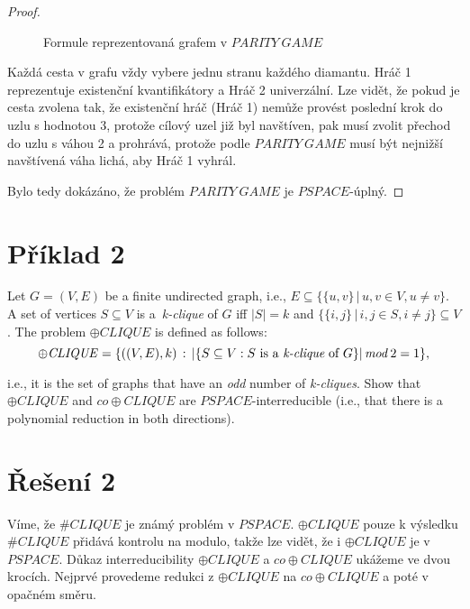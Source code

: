\documentclass[a4paper, 11pt, fleqn]{scrartcl}
\begin{document}
\begin{proof}
\begin{adjustwidth}{1em}{0em}
\begin{figure}[h]
\begin{tikzpicture}
            \end{tikzpicture}
            \caption{Formule reprezentovaná grafem v $\mathit{PARITY~GAME}$}
          \end{figure}

          Každá cesta v grafu vždy vybere jednu stranu každého diamantu. Hráč 1 reprezentuje existenční kvantifikátory a Hráč 2 univerzální. Lze vidět, že pokud je cesta zvolena tak, že existenční hráč (Hráč 1) nemůže provést poslední krok do uzlu s hodnotou 3, protože cílový uzel již byl navštíven, pak musí zvolit přechod do uzlu s váhou 2 a prohrává, protože podle $\mathit{PARITY~GAME}$ musí být nejnižší navštívená váha lichá, aby Hráč 1 vyhrál.
        \end{adjustwidth}

        \vspace{0.5cm}

        Bylo tedy dokázáno, že problém $\mathit{PARITY~GAME}$ je \footnotesize$\mathit{PSPACE}$\normalsize-úplný.
    \end{proof}


  \section*{Příklad 2}
    Let $G = (V, E)$ be a finite undirected graph, i.e., $E \subseteq \{\{u, v\}\, |\, u, v \in V, u \neq v\}$. A set of vertices $S \subseteq V$ is a~\textit{k-clique} of $G$ iff $|S| = k$ and $\{\{i, j\} \, |\, i, j \in S, i \neq j\} \subseteq V$ . The problem $\oplus\mathit{CLIQUE}$ is defined as follows:
    $$\oplus\mathit{CLIQUE} = \{((V, E), k)\, :\, |\{S \subseteq V : S\textnormal{ is a }\textit{k-clique}\textnormal{ of }G\}|\, \mathit{mod}\, 2 = 1\},$$

    i.e., it is the set of graphs that have an \textit{odd} number of \textit{k-cliques}. Show that $\oplus\mathit{CLIQUE}$ and $\mathit{co}\oplus\mathit{CLIQUE}$ are \footnotesize$\mathit{PSPACE}$\normalsize-interreducible (i.e., that there is a polynomial reduction in both directions).

  \section*{Řešení 2}
    Víme, že $\#\mathit{CLIQUE}$ je známý problém v \footnotesize$\mathit{PSPACE}$\normalsize. $\oplus\mathit{CLIQUE}$ pouze k výsledku $\#\mathit{CLIQUE}$ přidává kontrolu na modulo, takže lze vidět, že i  $\oplus\mathit{CLIQUE}$ je v \footnotesize$\mathit{PSPACE}$\normalsize. Důkaz interreducibility $\oplus\mathit{CLIQUE}$ a $\mathit{co}\oplus\mathit{CLIQUE}$ ukážeme ve dvou krocích. Nejprvé provedeme redukci z $\oplus\mathit{CLIQUE}$ na $\mathit{co}\oplus\mathit{CLIQUE}$ a poté v opačném směru.
\end{document}

